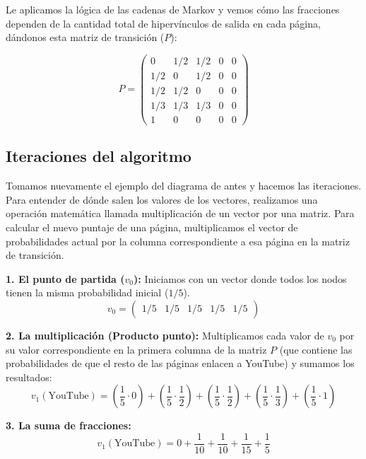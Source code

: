 \documentclass[12pt,letterpaper]{article}
\begin{document}
Le aplicamos la lógica de las cadenas de Markov y vemos cómo las fracciones dependen de la cantidad total de hipervínculos de salida en cada página, dándonos esta matriz de transición ($P$):

\begin{equation}
    P = \begin{pmatrix}
    0 & 1/2 & 1/2 & 0 & 0 \\
    1/2 & 0 & 1/2 & 0 & 0 \\
    1/2 & 1/2 & 0 & 0 & 0 \\
    1/3 & 1/3 & 1/3 & 0 & 0 \\
    1 & 0 & 0 & 0 & 0
    \end{pmatrix}
\end{equation}

\subsection{Iteraciones del algoritmo}
Tomamos nuevamente el ejemplo del diagrama de antes y hacemos las iteraciones. Para entender de dónde salen los valores de los vectores, realizamos una operación matemática llamada multiplicación de un vector por una matriz. Para calcular el nuevo puntaje de una página, multiplicamos el vector de probabilidades actual por la columna correspondiente a esa página en la matriz de transición.

\textbf{1. El punto de partida ($v_0$):}
Iniciamos con un vector donde todos los nodos tienen la misma probabilidad inicial ($1/5$).
\begin{equation}
    v_0 = \begin{pmatrix} 1/5 & 1/5 & 1/5 & 1/5 & 1/5 \end{pmatrix}
\end{equation}

\textbf{2. La multiplicación (Producto punto):}
Multiplicamos cada valor de $v_0$ por su valor correspondiente en la primera columna de la matriz $P$ (que contiene las probabilidades de que el resto de las páginas enlacen a YouTube) y sumamos los resultados:
\begin{equation}
    v_1(\text{YouTube}) = \left(\frac{1}{5} \cdot 0\right) + \left(\frac{1}{5} \cdot \frac{1}{2}\right) + \left(\frac{1}{5} \cdot \frac{1}{2}\right) + \left(\frac{1}{5} \cdot \frac{1}{3}\right) + \left(\frac{1}{5} \cdot 1\right)
\end{equation}

\textbf{3. La suma de fracciones:}
\begin{equation}
    v_1(\text{YouTube}) = 0 + \frac{1}{10} + \frac{1}{10} + \frac{1}{15} + \frac{1}{5}
\end{equation}
\end{document}
